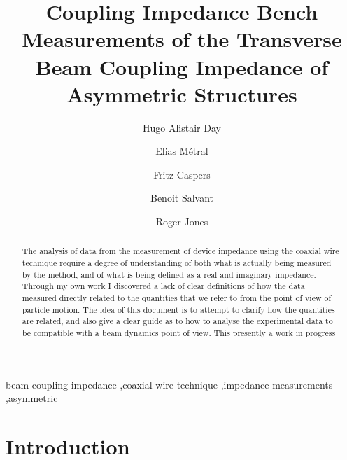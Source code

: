 \documentclass[review, number, sort&compress]{elsarticle}
\begin{document}
%

\begin{frontmatter}
\title{Coupling Impedance Bench Measurements of the Transverse Beam Coupling Impedance of Asymmetric Structures}

\author[manchester,cockcroft,cern]{Hugo Alistair Day}
\author[cern]{Elias Métral}
\author[cern]{Fritz Caspers}
\author[cern]{Benoit Salvant}
\author[manchester,cockcroft]{Roger Jones}


\address[manchester]{School of Physics and Astronomy, The University of Manchester, Oxford Road, 
Manchester, M13 9PL, UK}
\address[cockcroft]{Cockcroft Institute of Science and Technology, 
Daresbury, WA4 4AD, UK}
\address[cern]{CERN-European Organization for Nuclear Research, 
Geneva, Switzerland}

\begin{keyword}
beam coupling impedance \sep coaxial wire technique \sep impedance measurements \sep asymmetric
\end{keyword}

\begin{abstract}
The analysis of data from the measurement of device impedance using the coaxial wire technique require a degree of understanding of both what is actually being measured by the method, and of what is being defined as a real and imaginary impedance. Through my own work I discovered a lack of clear definitions of how the data measured directly related to the quantities that we refer to from the point of view of particle motion. The idea of this document is to attempt to clarify how the quantities are related, and also give a clear guide as to how to analyse the experimental data to be compatible with a beam dynamics point of view. This presently a work in progress
\end{abstract}

\end{frontmatter}


%

\section{Introduction}
\label{sec:Intro}
\end{document}
